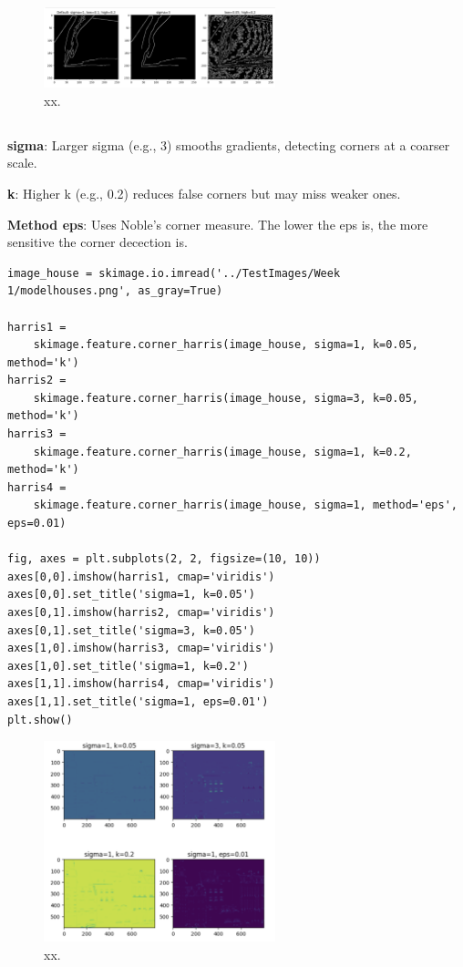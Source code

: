 \documentclass[12pt]{article}
\begin{document}
\begin{figure}[h]
    \centering
    \includegraphics[width=0.6\textwidth]{pics/a5-3.1} 
    \caption{xx.}
\end{figure}

\subsection{}

\textbf{sigma}: Larger sigma (e.g., 3) smooths gradients, detecting corners at a coarser scale.

\textbf{k}: Higher k (e.g., 0.2) reduces false corners but may miss weaker ones.

\textbf{Method eps}: Uses Noble’s corner measure. The lower the eps is, the more sensitive the corner decection is.

\begin{lstlisting}
image_house = skimage.io.imread('../TestImages/Week 1/modelhouses.png', as_gray=True)

harris1 = 
	skimage.feature.corner_harris(image_house, sigma=1, k=0.05, method='k')
harris2 = 
	skimage.feature.corner_harris(image_house, sigma=3, k=0.05, method='k')
harris3 = 
	skimage.feature.corner_harris(image_house, sigma=1, k=0.2, method='k')
harris4 = 
	skimage.feature.corner_harris(image_house, sigma=1, method='eps', eps=0.01)

fig, axes = plt.subplots(2, 2, figsize=(10, 10))
axes[0,0].imshow(harris1, cmap='viridis')
axes[0,0].set_title('sigma=1, k=0.05')
axes[0,1].imshow(harris2, cmap='viridis')
axes[0,1].set_title('sigma=3, k=0.05')
axes[1,0].imshow(harris3, cmap='viridis')
axes[1,0].set_title('sigma=1, k=0.2')
axes[1,1].imshow(harris4, cmap='viridis')
axes[1,1].set_title('sigma=1, eps=0.01')
plt.show()
\end{lstlisting}

\begin{figure}[h]
    \centering
    \includegraphics[width=0.6\textwidth]{pics/a5-3.2} 
    \caption{xx.}
\end{figure}
\end{document}
